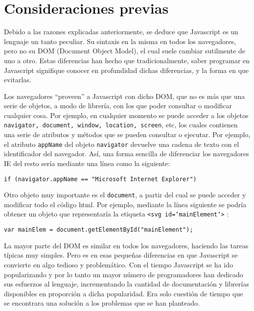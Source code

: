 \section{Consideraciones previas}
Debido a las razones explicadas anteriormente, se deduce que Javascript es un lenguaje un tanto peculiar. Su sintaxis en la misma en todos los navegadores, pero no su DOM (Document Object Model), el cual suele cambiar sutilmente de uno a otro. Estas diferencias han hecho que tradicionalmente, saber programar en Javascript signifique conocer en profundidad dichas diferencias, y la forma en que evitarlas.

Los navegadores ``proveen'' a Javascript con dicho DOM, que no es más que una serie de objetos, a modo de librería, con los que poder consultar o modificar cualquier cosa. Por ejemplo, en cualquier momento se puede acceder a los objetos \texttt{navigator, document, window, location, screen}, etc, los cuales contienen una serie de atributos y métodos que se pueden consultar o ejecutar. Por ejemplo, el atributo \texttt{appName} del objeto \texttt{navigator} devuelve una cadena de texto con el identificador del navegador. Así, una forma sencilla de diferenciar los navegadores IE del resto sería mediante una línea como la siguiente:

\begin{verbatim}
if (navigator.appName == "Microsoft Internet Explorer") 
\end{verbatim}

Otro objeto muy importante es el \texttt{document}, a partir del cual se puede acceder y modificar todo el código html. Por ejemplo, mediante la línea siguiente se podría obtener un objeto que representaría la etiqueta \texttt{<svg id=`mainElement`>} :

\begin{verbatim}
var mainElem = document.getElementById("mainElement");
\end{verbatim}

La mayor parte del DOM es similar en todos los navegadores, haciendo las tareas típicas muy simples. Pero es en esas pequeñas diferencias en que Javascript se convierte en algo tedioso y problemático. Con el tiempo Javascript se ha ido popularizando y por lo tanto un mayor número de programadores han dedicado sus esfuerzos al lenguaje, incrementando la cantidad de documentación y librerías disponibles en proporción a dicha popularidad. Era solo cuestión de tiempo que se encontrara una solución a los problemas que se han planteado.

